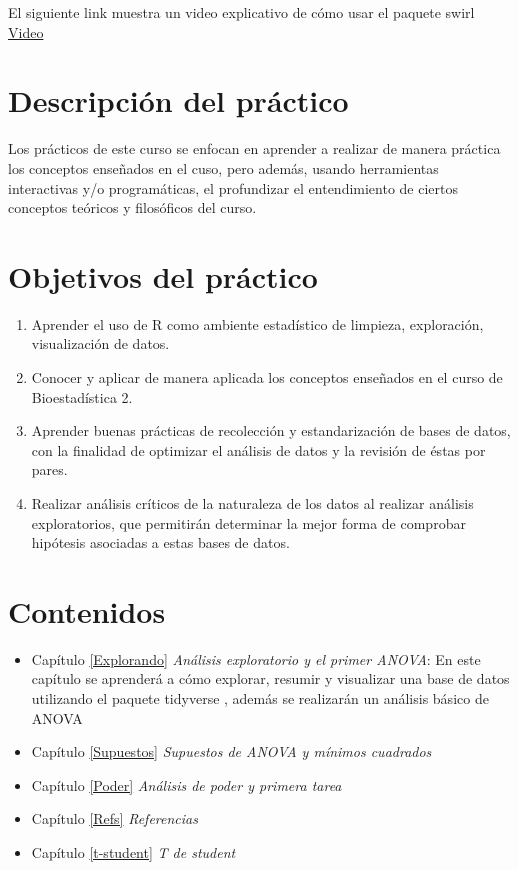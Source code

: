 \documentclass[]{book}
\begin{document}
El siguiente link muestra un video explicativo de cómo usar el paquete
swirl \href{https://youtu.be/w6L7Ye18yPE}{Video}

\section{Descripción del práctico}\label{descripcion-del-practico}

Los prácticos de este curso se enfocan en aprender a realizar de manera
práctica los conceptos enseñados en el cuso, pero además, usando
herramientas interactivas y/o programáticas, el profundizar el
entendimiento de ciertos conceptos teóricos y filosóficos del curso.

\section{Objetivos del práctico}\label{objetivos-del-practico}

\begin{enumerate}
\def\labelenumi{\arabic{enumi}.}
\item
  Aprender el uso de R como ambiente estadístico de limpieza,
  exploración, visualización de datos.
\item
  Conocer y aplicar de manera aplicada los conceptos enseñados en el
  curso de Bioestadística 2.
\item
  Aprender buenas prácticas de recolección y estandarización de bases de
  datos, con la finalidad de optimizar el análisis de datos y la
  revisión de éstas por pares.
\item
  Realizar análisis críticos de la naturaleza de los datos al realizar
  análisis exploratorios, que permitirán determinar la mejor forma de
  comprobar hipótesis asociadas a estas bases de datos.
\end{enumerate}

\section{Contenidos}\label{contenidos}

\begin{itemize}
\item
  Capítulo \ref{Explorando} \emph{Análisis exploratorio y el primer
  ANOVA}: En este capítulo se aprenderá a cómo explorar, resumir y
  visualizar una base de datos utilizando el paquete tidyverse
  \citep{WickhamTidy2017}, además se realizarán un análisis básico de
  ANOVA
\item
  Capítulo \ref{Supuestos} \emph{Supuestos de ANOVA y mínimos cuadrados}
\item
  Capítulo \ref{Poder} \emph{Análisis de poder y primera tarea}
\item
  Capítulo \ref{Refs} \emph{Referencias}
\item
  Capítulo \ref{t-student} \emph{T de student}
\end{itemize}
\end{document}
